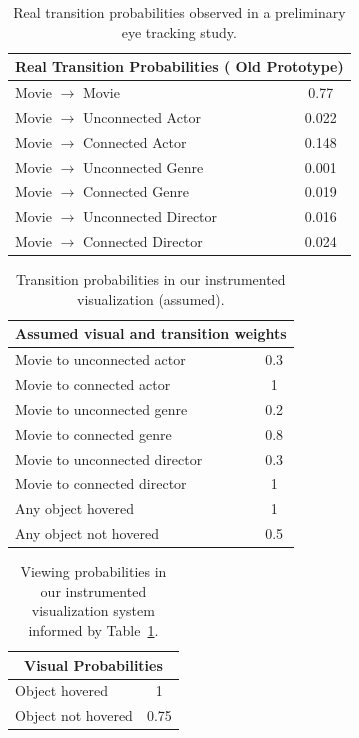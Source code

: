 \begin{table}[htbp]
	\centering
		\begin{tabular}{|l|c|}
			\hline
			 \multicolumn{2}{|c|}{Real Transition Probabilities ( Old Prototype)} \\ \hline
			Movie $\rightarrow$ Movie & 0.77\\\hline
			Movie $\rightarrow$ Unconnected Actor & 0.022\\\hline
			Movie $\rightarrow$ Connected Actor & 0.148\\\hline
			Movie $\rightarrow$ Unconnected Genre & 0.001\\\hline
			Movie $\rightarrow$ Connected Genre & 0.019\\\hline
			Movie $\rightarrow$ Unconnected Director & 0.016\\\hline
			Movie $\rightarrow$ Connected Director & 0.024\\
			\hline			
		\end{tabular}
	\caption{Real transition probabilities observed in a preliminary eye tracking study.}
	\label{tab:Transition1}
\end{table}

\begin{table}[htbp]
	\centering
		\begin{tabular}{|l|c|}
			\hline
			 \multicolumn{2}{|c|}{Assumed visual and transition weights} \\ \hline
			Movie to unconnected actor & 0.3\\\hline
			Movie to connected actor & 1\\\hline
			Movie to unconnected genre & 0.2\\\hline
			Movie to connected genre & 0.8\\\hline
			Movie to unconnected director & 0.3\\\hline
			Movie to connected director & 1\\\hline
			Any object hovered & 1\\\hline
			Any object not hovered & 0.5\\
			\hline			
		\end{tabular}
	\caption{Transition probabilities in our instrumented visualization (assumed).}
	\label{tab:Transition2}
\end{table}

\begin{table}[htbp]
	\centering
		\begin{tabular}{|l|c|}
			\hline
			 \multicolumn{2}{|c|}{Visual Probabilities} \\ \hline
				Object hovered & 1\\\hline
				Object not hovered & 0.75\\
			\hline			
		\end{tabular}
	\caption{Viewing probabilities in our instrumented visualization system informed by Table~\ref{tab:Transition1}.}
	\label{tab:Transition3}
\end{table}

